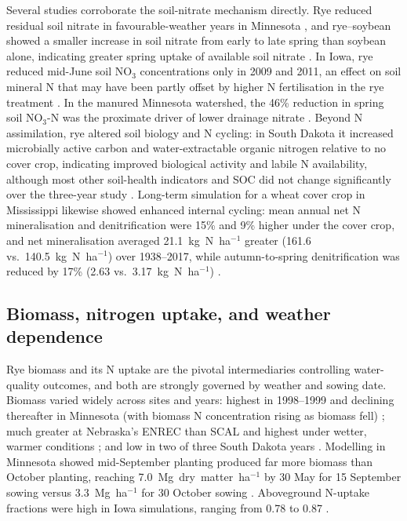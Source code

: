 Several studies corroborate the soil-nitrate mechanism directly. Rye reduced residual soil nitrate in favourable-weather years in Minnesota \parencite{Strock2004}, and rye--soybean showed a smaller increase in soil nitrate from early to late spring than soybean alone, indicating greater spring uptake of available soil nitrate \parencite{Qi2011b}. In Iowa, rye reduced mid-June soil NO$_3$ concentrations only in 2009 and 2011, an effect on soil mineral N that may have been partly offset by higher N fertilisation in the rye treatment \parencite{MartinezFeria2016}. In the manured Minnesota watershed, the 46\% reduction in spring soil NO$_3$-N was the proximate driver of lower drainage nitrate \parencite{Krueger2013}. Beyond N assimilation, rye altered soil biology and N cycling: in South Dakota it increased microbially active carbon and water-extractable organic nitrogen relative to no cover crop, indicating improved biological activity and labile N availability, although most other soil-health indicators and SOC did not change significantly over the three-year study \parencite{Bawa2023}. Long-term simulation for a wheat cover crop in Mississippi likewise showed enhanced internal cycling: mean annual net N mineralisation and denitrification were 15\% and 9\% higher under the cover crop, and net mineralisation averaged 21.1~kg~N~ha$^{-1}$ greater (161.6 vs.\ 140.5~kg~N~ha$^{-1}$) over 1938--2017, while autumn-to-spring denitrification was reduced by 17\% (2.63 vs.\ 3.17~kg~N~ha$^{-1}$) \parencite{Yang2021}.

\subsection{Biomass, nitrogen uptake, and weather dependence}
Rye biomass and its N uptake are the pivotal intermediaries controlling water-quality outcomes, and both are strongly governed by weather and sowing date. Biomass varied widely across sites and years: highest in 1998--1999 and declining thereafter in Minnesota (with biomass N concentration rising as biomass fell) \parencite{Strock2004}; much greater at Nebraska's ENREC than SCAL and highest under wetter, warmer conditions \parencite{Birru2023}; and low in two of three South Dakota years \parencite{Bawa2023}. Modelling in Minnesota showed mid-September planting produced far more biomass than October planting, reaching 7.0~Mg~dry~matter~ha$^{-1}$ by 30 May for 15 September sowing versus 3.3~Mg~ha$^{-1}$ for 30 October sowing \parencite{Feyereisen2006b}. Aboveground N-uptake fractions were high in Iowa simulations, ranging from 0.78 to 0.87 \parencite{Malone2018}.

